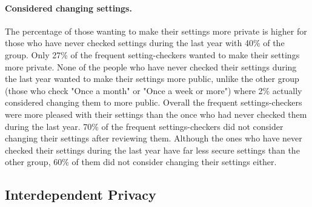 \paragraph{Considered changing settings.}
The percentage of those wanting to make their settings more private is higher for those who have never checked settings during the last year with 40\% of the group. Only 27\% of the frequent setting-checkers wanted to make their settings more private. 
None of the people who have never checked their settings during the last year wanted to make their settings more public, unlike the other group (those who check "Once a month" or "Once a week or more") where 2\% actually considered changing them to more public. Overall the frequent settings-checkers were more pleased with their settings than the once who had never checked them during the last year. 70\% of the frequent settings-checkers did not consider changing their settings after reviewing them. Although the ones who have never checked their settings during the last year have far less secure settings than the other group, 60\% of them did not consider changing their settings either. 


\subsection{Interdependent Privacy}


